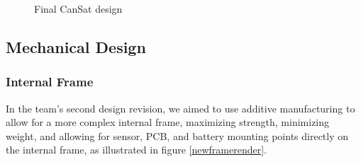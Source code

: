 \documentclass[]{report}
\begin{document}
\begin{figure}
\begin{subfigure}{.5\textwidth}
			\end{subfigure}
			\caption{Final CanSat design}
			\label{newcansat}
		\end{figure}
		
		\subsection{Mechanical Design}
		
		\subsubsection{Internal Frame}
		
		In the team's second design revision, we aimed to use additive manufacturing to allow for a more complex internal frame, maximizing strength, minimizing weight, and allowing for sensor, PCB, and battery mounting points directly on the internal frame, as illustrated in figure \ref{newframerender}.
		
		
\end{document}
